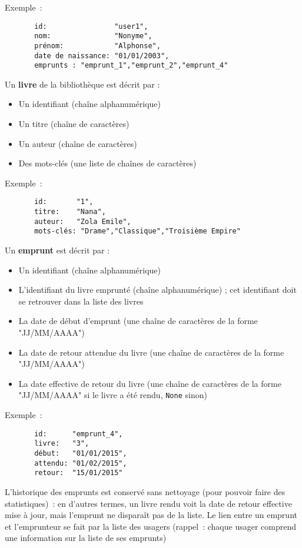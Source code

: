 \documentclass[10pt,a4paper]{sujets-exercices}
\begin{document}
Exemple~:
{\small
\begin{verbatim}
       id:                "user1", 
       nom:               "Nonyme", 
       prénom:            "Alphonse", 
       date de naissance: "01/01/2003", 
       emprunts : "emprunt_1","emprunt_2","emprunt_4"
\end{verbatim}
}


Un \textbf{livre} de la bibliothèque est décrit par : 

\begin{itemize}
\item Un identifiant (chaîne alphanumérique)
\item Un titre (chaîne de caractères)
\item Un auteur (chaîne de caractères)
\item Des mots-clés (une liste de chaînes de caractères)
\end{itemize}

Exemple~:
{\small
\begin{verbatim}
       id:       "1",
       titre:    "Nana",
       auteur:   "Zola Emile",
       mots-clés: "Drame","Classique","Troisième Empire"
\end{verbatim}
}

Un \textbf{emprunt} est décrit par :

\begin{itemize}
\item Un identifiant (chaîne alphanumérique)
\item L'identifiant du livre emprunté (chaîne alphanumérique) ; cet identifiant doit se retrouver dans la liste des livres
\item La date de début d'emprunt (une chaîne de caractères de la forme "JJ/MM/AAAA")
\item La date de retour attendue du livre (une chaîne de caractères de la forme "JJ/MM/AAAA")
\item La date effective de retour du livre (une chaîne de caractères de la forme "JJ/MM/AAAA" si le livre a été rendu, \texttt{None} sinon)
\end{itemize}

Exemple~:
{\small
\begin{verbatim}
       id:      "emprunt_4",
       livre:   "3",
       début:   "01/01/2015",
       attendu: "01/02/2015",
       retour:  "15/01/2015"
\end{verbatim}
}

L'historique des emprunts est conservé sans nettoyage (pour pouvoir faire des statistiques)~: en d'autres termes, un livre rendu voit la date de retour effective mise à jour, mais l'emprunt ne disparaît pas de la liste. Le lien entre un emprunt et l'emprunteur se fait par la liste des usagers (rappel~: chaque usager comprend une information sur la liste de ses emprunts)
\end{document}
